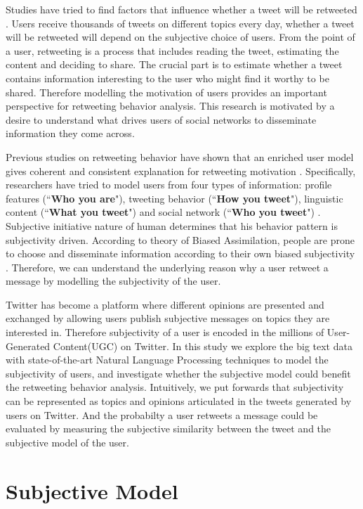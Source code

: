\documentclass[letterpaper]{article}
\begin{document}
Studies have tried to find factors that influence whether a tweet will be retweeted \cite{Boyd2010,Kwak:2010TSN,Suh2010}. 
Users receive thousands of tweets on different topics every day, whether a tweet will be retweeted will depend on the subjective choice of users. 
From the point of a user, retweeting is a process that includes reading the tweet, estimating the content and deciding to share. The crucial part is to estimate whether a tweet contains information interesting to the user who might find it worthy to be shared.  
Therefore modelling the motivation of users provides an important perspective for retweeting behavior analysis. 
This research is motivated by a desire to understand what drives users of social networks to disseminate information they come across. 

Previous studies on retweeting behavior have shown that an enriched user model gives coherent and consistent explanation for retweeting motivation \cite{conf/icwsm/MacskassyM11,conf/wsdm/FengW13}. 
Specifically, researchers have tried to model users from four types of information:
profile features (``\textbf{Who you are}"), tweeting behavior (``\textbf{How you tweet}"), linguistic content (``\textbf{What you tweet}") and social network (``\textbf{Who you tweet}") \cite{Pennacchiotti:icwsm11}. 
Subjective initiative nature of human determines that his behavior pattern is subjectivity driven. 
According to theory of Biased Assimilation, people are prone to choose and disseminate information according to their own biased subjectivity \cite{Hyman2000}. 
Therefore, we can understand the underlying reason why a user retweet a message by modelling the subjectivity of the user. 

Twitter has become a platform where different opinions are presented and exchanged by allowing users publish subjective messages on topics they are interested in. 
Therefore subjectivity of a user is encoded in the millions of User-Generated Content(UGC) on Twitter. 
In this study we explore the big text data with state-of-the-art Natural Language Processing techniques to model the subjectivity of users, and investigate whether the subjective model could benefit the retweeting behavior analysis. 
Intuitively, we put forwards that subjectivity can be represented as topics and opinions articulated in the tweets generated by users on Twitter. 
And the probabilty a user retweets a message could be evaluated by measuring the subjective similarity between the tweet and the subjective model of the user. 

\section{Subjective Model}
\label{subjectivemodel}
\end{document}
